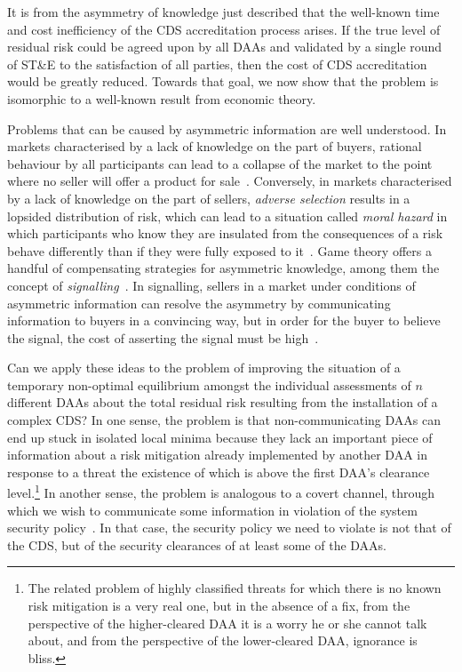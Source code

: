 \documentclass{llncs}
\begin{document}
It is from the asymmetry of knowledge
just described that the well-known time and cost inefficiency of the CDS
accreditation process arises.
If the true level of residual risk could be agreed upon by all DAAs and
validated by a single round of ST\&E to the satisfaction of all parties,
then the cost of CDS accreditation would be greatly reduced.  Towards that goal,
we now show that the problem is isomorphic to a well-known result from economic
theory.

Problems that can be caused by asymmetric information are well understood.
In markets characterised by a lack of knowledge on the part of
buyers, rational behaviour by all participants can lead to a collapse
of the market to the point where no seller will offer a product for
sale~\cite{Akerlof1970}.
Conversely, in markets characterised by a lack of knowledge on the
part of sellers, \emph{adverse selection} results in a lopsided distribution
of risk, which can lead to a situation called \emph{moral hazard} in which
participants who know they are insulated from the consequences of a
risk behave differently than if they were fully exposed to it~\cite{Crosby1905}.
Game theory offers a handful of compensating strategies for asymmetric
knowledge, among them the concept
of \emph{signalling}~\cite{Spence1973,Stigler1961}.  In signalling,
sellers in a market under conditions of asymmetric information
can resolve the asymmetry by communicating information to buyers in a
convincing way, but in order for the buyer to believe the signal, the cost
of asserting the signal must be high~\cite{Spence1973}.

Can we apply these ideas to the problem of improving the situation of a
temporary non-optimal equilibrium amongst the individual assessments
of $n$ different DAAs about the total residual risk resulting from the
installation of a complex CDS?  In one sense, the problem is that
non-communicating DAAs can end up stuck in isolated local minima
because they lack an important piece of information
about a risk mitigation
already implemented by another DAA in response to a threat the existence
of which is above the first DAA's clearance level.\footnote{The related problem
of highly classified
threats for which there is no known risk mitigation is a very real one,
but in the absence of a fix, from the perspective of the higher-cleared
DAA it is a worry he or she cannot talk about, and from the perspective of the
lower-cleared DAA, ignorance is bliss.}  In another sense, the problem
is analogous to a covert channel, through which we wish to communicate
some information in violation of the system security policy~\cite{NCSC-TG-030}.
In that case, the security policy we need to violate is not that of the CDS, but of
the security clearances of at least some of the DAAs.
\end{document}

